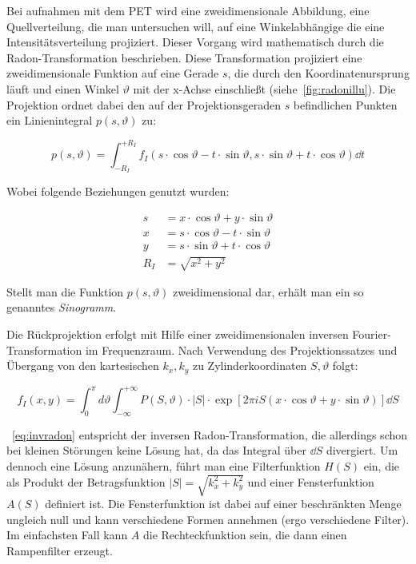 \documentclass[slug=PET, room=Andreas-Schubert-Bau\,\ 424A, supervisor=Carsten\ Bittrich, coursedate=10.\ 01.\ 2020]{../../Lab_Report_LaTeX/lab_report}
\begin{document}
Bei aufnahmen mit dem PET wird eine zweidimensionale Abbildung, eine
Quellverteilung, die man untersuchen will, auf eine Winkelabh\"angige
die eine Intensitätsverteilung projiziert.  Dieser Vorgang wird
mathematisch durch die Radon-Transformation beschrieben. Diese
Transformation projiziert eine zweidimensionale Funktion auf eine
Gerade \(s\), die durch den Koordinatenursprung läuft und einen Winkel
\(\vartheta\) mit der x-Achse einschließt (siehe~\ref{fig:radonillu}).
Die Projektion ordnet dabei den auf der Projektionsgeraden \(s\)
befindlichen Punkten ein Linienintegral \(p(s, \vartheta)\) zu:

\begin{equation}\label{eq:linienint}
        p(s, \vartheta) = \int_{-R_I}^{+R_I} f_I(s \cdot \cos
        \vartheta - t \cdot \sin \vartheta, s \cdot \sin\vartheta + t
        \cdot \cos\vartheta) \dd{t}
\end{equation}

Wobei folgende Beziehungen genutzt wurden:

\begin{align}
        s &= x \cdot \cos\vartheta + y \cdot \sin\vartheta \\
        x &= s \cdot \cos \vartheta - t \cdot \sin \vartheta \\
        y &= s \cdot \sin\vartheta + t \cdot \cos\vartheta \\
        R_I &= \sqrt{x^2 + y^2}
\end{align}

Stellt man die Funktion \(p(s, \vartheta)\) zweidimensional dar, erhält man ein so genanntes
\emph{Sinogramm}.

Die Rückprojektion erfolgt mit Hilfe einer zweidimensionalen inversen Fourier-Transformation im
Frequenzraum. Nach Verwendung des Projektionssatzes und Übergang von den kartesischen \(k_x, k_y\)
zu Zylinderkoordinaten \(S, \vartheta\) folgt:

\begin{equation}\label{eq:invradon}
        f_I(x,y) = \int_{0}^{\pi} d\vartheta \int_{-\infty}^{+\infty}
        P(S, \vartheta) \cdot |S| \cdot \exp[2\pi i S(x \cdot
        \cos\vartheta + y \cdot \sin\vartheta)] \dd{S}
\end{equation}

~\eqref{eq:invradon} entspricht der inversen Radon-Transformation, die
allerdings schon bei kleinen St\"orungen keine Lösung
hat, da das Integral über \(\dd{S}\) divergiert.
Um dennoch eine Lösung anzunähern, führt man eine Filterfunktion \(H(S)\) ein, die als Produkt der
Betragsfunktion \(|S| = \sqrt{k_x^2+k_y^2}\) und einer Fensterfunktion
\(A(S)\) definiert ist. Die Fensterfunktion ist dabei auf einer
beschr\"ankten Menge ungleich null und kann verschiedene Formen
annehmen (ergo verschiedene Filter). Im einfachsten Fall kann \(A\)
die Rechteckfunktion sein, die dann einen Rampenfilter erzeugt.
\end{document}
